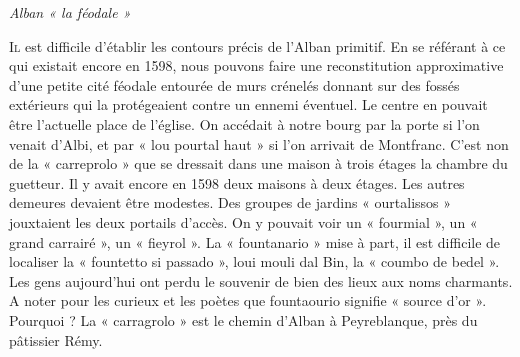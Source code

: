 
\begin{center}
  {\Large\itshape Alban « la féodale »}
\end{center}

\vspace{1.5em}

\noindent
\lettrine{I}{l} est difficile d'établir les contours précis de l'Alban primitif.
En se référant à ce qui existait encore en 1598, nous pouvons faire une
reconstitution approximative d'une petite cité féodale entourée de murs
crénelés donnant sur des fossés extérieurs qui la protégeaient contre un
ennemi éventuel. Le centre en pouvait être l'actuelle place de l'église.
On accédait à notre bourg par la porte si l'on venait d'Albi, et par
« lou pourtal haut » si l'on arrivait de Montfranc. C'est non de la
« carreprolo » que se dressait dans une maison à trois étages la chambre
du guetteur. Il y avait encore en 1598 deux maisons à deux étages.
Les autres demeures devaient être modestes. Des groupes de jardins
« ourtalissos » jouxtaient les deux portails d'accès. On y pouvait voir
un « fourmial », un « grand carrairé », un « fieyrol ». La « fountanario »
mise à part, il est difficile de localiser la « fountetto si passado »,
loui mouli dal Bin, la « coumbo de bedel ». Les gens aujourd'hui ont
perdu le souvenir de bien des lieux aux noms charmants. A noter pour
les curieux et les poètes que fountaourio signifie « source d'or ».
Pourquoi ? La « carragrolo » est le chemin d'Alban à Peyreblanque,
près du pâtissier Rémy.
